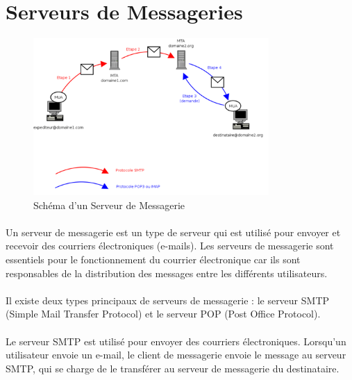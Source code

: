 \section{Serveurs de Messageries}
	\begin{figure}[h]
		\begin{center}
			
	
		\includegraphics[width=0.8\textwidth]{PhotoMemoire/Serveur_Messagerie.png}
\caption{Schéma d'un Serveur de Messagerie}
	\end{center}
\end{figure}
\paragraph{ }

Un serveur de messagerie est un type de serveur qui est utilisé pour envoyer et recevoir des courriers électroniques (e-mails). Les serveurs de messagerie sont essentiels pour le fonctionnement du courrier électronique car ils sont responsables de la distribution des messages entre les différents utilisateurs.\\
\paragraph{ }
Il existe deux types principaux de serveurs de messagerie : le serveur SMTP (Simple Mail Transfer Protocol) et le serveur POP (Post Office Protocol).\\
\paragraph{ }
Le serveur SMTP est utilisé pour envoyer des courriers électroniques. Lorsqu'un utilisateur envoie un e-mail, le client de messagerie envoie le message au serveur SMTP, qui se charge de le transférer au serveur de messagerie du destinataire.\\

